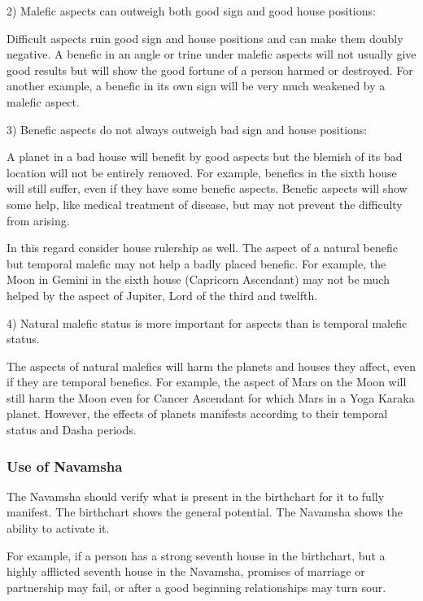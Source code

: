  

2) Malefic aspects can outweigh both good sign and good house positions:

Difficult aspects ruin good sign and house positions and can make them doubly negative. A benefic in an angle or trine under malefic aspects will not usually give good results but will show the good fortune of a person harmed or destroyed. For another example, a benefic in its own sign will be very much weakened by a malefic aspect.

 

3) Benefic aspects do not always outweigh bad sign and house positions:

A planet in a bad house will benefit by good aspects but the blemish of its bad location will not be entirely removed. For example, benefics in the sixth house will still suffer, even if they have some benefic aspects. Benefic aspects will show some help, like medical treatment of disease, but may not prevent the difficulty from arising.

In this regard consider house rulership as well. The aspect of a natural benefic but temporal malefic may not help a badly placed benefic. For example, the Moon in Gemini in the sixth house (Capricorn Ascendant) may not be much helped by the aspect of Jupiter, Lord of the third and twelfth.

 

4) Natural malefic status is more important for aspects than is temporal malefic status.

The aspects of natural malefics will harm the planets and houses they affect, even if they are temporal benefics. For example, the aspect of Mars on the Moon will still harm the Moon even for Cancer Ascendant for which Mars in a Yoga Karaka planet. However, the effects of planets manifests according to their temporal status and Dasha periods.

 

\subsubsection{Use of Navamsha}
 

The Navamsha should verify what is present in the birthchart for it to fully manifest. The birthchart shows the general potential. The Navamsha shows the ability to activate it.

 

For example, if a person has a strong seventh house in the birthchart, but a highly afflicted seventh house in the Navamsha, promises of marriage or partnership may fail, or after a good beginning relationships may turn sour.

